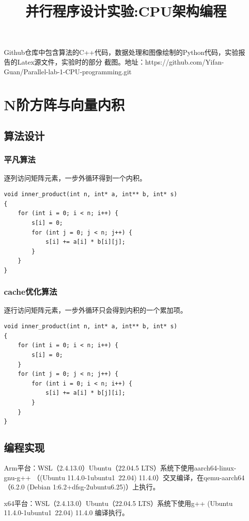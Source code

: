 \documentclass[12pt, a4paper, oneside]{ctexart}
\title{并行程序设计实验:CPU架构编程}
\date{}
\begin{document}
\maketitle
Github仓库中包含算法的C++代码，数据处理和图像绘制的Python代码，实验报告的Latex源文件，实验时的部分
截图。地址：https://github.com/Yifan-Guan/Parallel-lab-1-CPU-programming.git
\section{N阶方阵与向量内积}
\subsection{算法设计}
\subsubsection{平凡算法}
逐列访问矩阵元素，一步外循环得到一个内积。
\begin{lstlisting}
void inner_product(int n, int* a, int** b, int* s)
{
	for (int i = 0; i < n; i++) {
		s[i] = 0;
		for (int j = 0; j < n; j++) {
			s[i] += a[i] * b[i][j];
		}
	}
}
\end{lstlisting}
\subsubsection{cache优化算法}
逐行访问矩阵元素，一步外循环只会得到内积的一个累加项。
\begin{lstlisting}
void inner_product(int n, int* a, int** b, int* s)
{
    for (int i = 0; i < n; i++) {
        s[i] = 0;
    }
    for (int j = 0; j < n; j++) {
        for (int i = 0; i < n; i++) {
            s[i] += a[i] * b[j][i];
        }
    }
}
\end{lstlisting}
\subsection{编程实现}
Arm平台：WSL（2.4.13.0）Ubuntu（22.04.5 LTS）系统下使用aarch64-linux-gnu-g++
（(Ubuntu 11.4.0-1ubuntu1~22.04) 11.4.0）交叉编译，在qemu-aarch64
（6.2.0 (Debian 1:6.2+dfsg-2ubuntu6.25)）上执行。

x64平台：WSL（2.4.13.0）Ubuntu（22.04.5 LTS）系统下使用g++ (Ubuntu 11.4.0-1ubuntu1~22.04) 11.4.0
编译执行。
\end{document}
